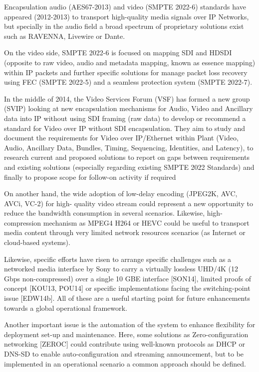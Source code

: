 Encapsulation audio (AES67-2013) and video (SMPTE 2022-6) standards have appeared (2012-2013) to transport high-quality media signals over IP Networks, but specially in the audio field a broad spectrum of proprietary solutions exist such as RAVENNA, Livewire or Dante.

On the video side, SMPTE 2022-6 is focused on mapping SDI and HDSDI (opposite to raw video,
audio and metadata mapping, known as essence mapping) within IP packets and further specific
solutions for manage packet loss recovery using FEC (SMPTE 2022-5) and a seamless protection
system (SMPTE 2022-7).

In the middle of 2014, the Video Services Forum (VSF) has formed a new group (SVIP) looking at
new encapsulation mechanisms for Audio, Video and Ancillary data into IP without using SDI
framing (raw data) to develop or recommend a standard for Video over IP without SDI encapsulation.
They aim to study and document the requirements for Video over IP/Ethernet within Plant (Video,
Audio, Ancillary Data, Bundles, Timing, Sequencing, Identities, and Latency), to research current
and proposed solutions to report on gaps between requirements and existing solutions (especially
regarding existing SMPTE 2022 Standards) and finally to propose scope for follow-on activity if
required

On another hand, the wide adoption of low-delay encoding (JPEG2K, AVC, AVCi, VC-2) for high-
quality video stream could represent a new opportunity to reduce the bandwidth consumption in
several scenarios. Likewise, high-compression mechanism as MPEG4 H264 or HEVC could be
useful to transport media content through very limited network resources scenarios (as Internet or
cloud-based systems).

Likewise, specific efforts have risen to arrange specific challenges such as a networked media
interface by Sony to carry a virtually lossless UHD/4K (12 Gbps non-compressed) over a single 10
GBE interface [SON14], limited proofs of concept [KOU13, POU14] or specific implementations
facing the switching-point issue [EDW14b]. All of these are a useful starting point for future
enhancements towards a global operational framework.

Another important issue is the automation of the system to enhance flexibility for deployment set-up
and maintenance. Here, some solutions as Zero-configuration networking [ZEROC] could contribute
using well-known protocols as DHCP or DNS-SD to enable auto-configuration and streaming
announcement, but to be implemented in an operational scenario a common approach should be
defined.

